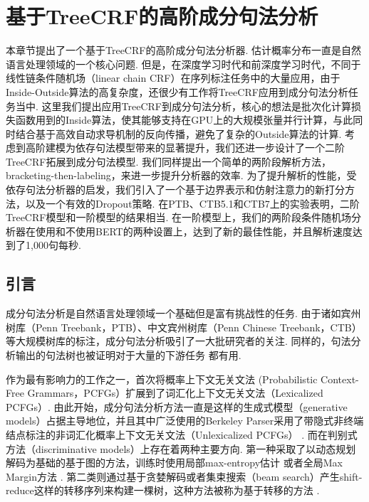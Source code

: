 \chapter{基于TreeCRF的高阶成分句法分析}
\label{cha:con-crf}

本章节提出了一个基于TreeCRF的高阶成分句法分析器.
估计概率分布一直是自然语言处理领域的一个核心问题.
但是，在深度学习时代和前深度学习时代，不同于线性链条件随机场（linear chain CRF）在序列标注任务中的大量应用，由于Inside-Outside算法的高复杂度，还很少有工作将TreeCRF应用到成分句法分析任务当中.
这里我们提出应用TreeCRF到成分句法分析，核心的想法是批次化计算损失函数用到的Inside算法，使其能够支持在GPU上的大规模张量并行计算，与此同时结合基于高效自动求导机制的反向传播，避免了复杂的Outside算法的计算.
考虑到高阶建模为依存句法模型带来的显著提升，我们还进一步设计了一个二阶TreeCRF拓展到成分句法模型.
我们同样提出一个简单的两阶段解析方法，bracketing-then-labeling，来进一步提升分析器的效率.
为了提升解析的性能，受依存句法分析器的启发，我们引入了一个基于边界表示和仿射注意力的新打分方法，以及一个有效的Dropout策略.
在PTB、CTB5.1和CTB7上的实验表明，二阶TreeCRF模型和一阶模型的结果相当.
在一阶模型上，我们的两阶段条件随机场分析器在使用和不使用BERT的两种设置上，达到了新的最佳性能，并且解析速度达到了1,000句每秒.

\section{引言}\label{sec:con-intro}

成分句法分析是自然语言处理领域一个基础但是富有挑战性的任务.
由于诸如宾州树库（Penn Treebank，PTB）、中文宾州树库（Penn Chinese Treebank，CTB）等大规模树库的标注，成分句法分析吸引了一大批研究者的关注.
同样的，句法分析输出的句法树也被证明对于大量的下游任务 \citep{akoury-etal-2019-syntactically,wang-etal-2018-tree}都有用.

作为最有影响力的工作之一，\citet{collins-1997-three}首次将概率上下文无关文法 (Probabilistic Context-Free Grammars，PCFGs）扩展到了词汇化上下文无关文法（Lexicalized PCFGs）.
由此开始，成分句法分析方法一直是这样的生成式模型（generative models）占据主导地位，并且其中广泛使用的Berkeley Parser采用了带隐式非终端结点标注的非词汇化概率上下文无关文法（Unlexicalized PCFGs） \citep{matsuzaki-etal-2005-probabilistic,petrov-klein-2007-improved}.
而在判别式方法（discriminative models）上存在着两种主要方向.
第一种采取了以动态规划解码为基础的基于图的方法，训练时使用局部max-entropy估计 \citep{kaplan-etal-2004-speed}或者全局Max Margin方法 \citep{taskar-etal-2004-max}.
第二类则通过基于贪婪解码或者集束搜索（beam search）产生shift-reduce这样的转移序列来构建一棵树，这种方法被称为基于转移的方法 \citep{sagae-lavie-2005-classifier,zhu-etal-2013-fast}.

